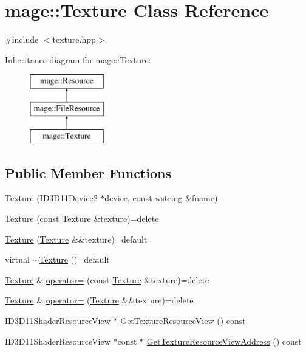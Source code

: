 \hypertarget{classmage_1_1_texture}{}\section{mage\+:\+:Texture Class Reference}
\label{classmage_1_1_texture}


{\ttfamily \#include $<$texture.\+hpp$>$}

Inheritance diagram for mage\+:\+:Texture\+:\begin{figure}[H]
\begin{center}
\leavevmode
\includegraphics[height=3.000000cm]{classmage_1_1_texture}
\end{center}
\end{figure}
\subsection*{Public Member Functions}
\begin{DoxyCompactItemize}
\item 
\hyperlink{classmage_1_1_texture_a680c4df56476b4c66c1e2ffd5bef63c2}{Texture} (I\+D3\+D11\+Device2 $\ast$device, const wstring \&fname)
\item 
\hyperlink{classmage_1_1_texture_aed9e8ab5bc3efdeb381672fd4e243ea7}{Texture} (const \hyperlink{classmage_1_1_texture}{Texture} \&texture)=delete
\item 
\hyperlink{classmage_1_1_texture_a9297257bfe76e744cb02bbbb51f73348}{Texture} (\hyperlink{classmage_1_1_texture}{Texture} \&\&texture)=default
\item 
virtual \hyperlink{classmage_1_1_texture_a81664804ac0259e8c67851409ee106fa}{$\sim$\+Texture} ()=default
\item 
\hyperlink{classmage_1_1_texture}{Texture} \& \hyperlink{classmage_1_1_texture_a0b73b4df98d729c8f60e58b0ca065636}{operator=} (const \hyperlink{classmage_1_1_texture}{Texture} \&texture)=delete
\item 
\hyperlink{classmage_1_1_texture}{Texture} \& \hyperlink{classmage_1_1_texture_a765e9cf3bddedbe2795dea0fe57245ff}{operator=} (\hyperlink{classmage_1_1_texture}{Texture} \&\&texture)=delete
\item 
I\+D3\+D11\+Shader\+Resource\+View $\ast$ \hyperlink{classmage_1_1_texture_a8b04efb947c49819642f86c8a16f813b}{Get\+Texture\+Resource\+View} () const
\item 
I\+D3\+D11\+Shader\+Resource\+View $\ast$const  $\ast$ \hyperlink{classmage_1_1_texture_ae7a45b80e575237d218dc9c6f059e87c}{Get\+Texture\+Resource\+View\+Address} () const
\end{DoxyCompactItemize}
